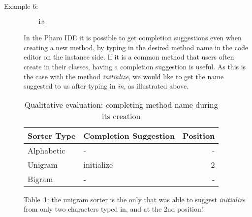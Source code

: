 \begin{description}
\item [Example 6:] \hfill
\begin{lstlisting}
    in
\end{lstlisting}
In the Pharo IDE it is possible to get completion suggestions even when creating a new method, by typing in the desired method name in the code editor on the instance side. If it is a common method that users often create in their classes, having a completion suggestion is useful. As this is the case with the method \textit{initialize}, we would like to get the name suggested to us after typing in \textit{in}, as illustrated above.
\begin{table}[H]
    \centering
    \begin{tabular}{llr}
    \hline
    \textbf{Sorter Type} & \textbf{Completion Suggestion} & \textbf{Position} \\ \hline
    Alphabetic & - & - \\ \hline
    Unigram & initialize & 2 \\ \hline
    Bigram & - & - \\ \hline
    \end{tabular}
\caption{Qualitative evaluation: completing method name during its creation}
\label{table:qual6}
\end{table}
Table~\ref{table:qual6}: the unigram sorter is the only that was able to suggest \textit{initialize} from only two characters typed in, and at the 2nd position!


\end{description}
